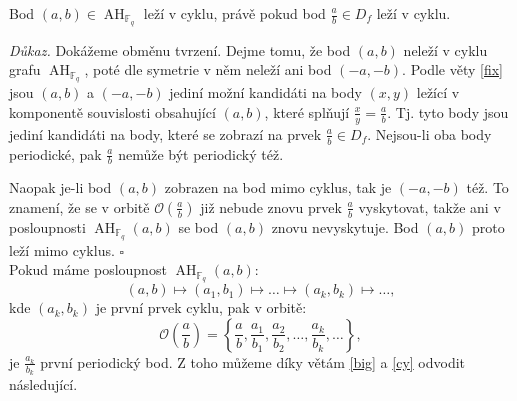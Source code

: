\documentclass[12pt]{report}
\DeclareMathOperator{\AH}{AH}
\begin{document}
\begin{veta}\label{cy}
Bod $(a,b) \in \AH_{\mathbb{F}_q}$ leží v cyklu, právě pokud bod $\frac{a}{b} \in D_f$ leží v cyklu.
\end{veta}
\noindent \textit{Důkaz.} Dokážeme obměnu tvrzení. Dejme tomu, že bod $(a,b)$ neleží v cyklu grafu $\AH_{\mathbb{F}_q}$, poté dle symetrie v něm neleží ani bod $(-a,-b)$. Podle věty \ref{fix} jsou $(a,b)$ a $(-a,-b)$ jediní možní kandidáti na body $(x,y)$ ležící v komponentě souvislosti obsahující $(a,b)$, které splňují $\frac{x}{y} = \frac{a}{b}$. Tj. tyto body jsou jediní kandidáti na body, které se zobrazí na prvek $\frac{a}{b} \in D_f$. Nejsou-li oba body periodické, pak $\frac{a}{b}$ nemůže být periodický též.

Naopak je-li bod $(a,b)$ zobrazen na bod mimo cyklus, tak je $(-a,-b)$ též. To znamení, že se v orbitě $\mathcal{O}\left(\frac{a}{b}\right)$ již nebude znovu prvek $\frac{a}{b}$ vyskytovat, takže ani v posloupnosti $\AH_{\mathbb{F}_q} (a,b)$ se bod $(a,b)$ znovu nevyskytuje. Bod $(a,b)$ proto leží mimo cyklus. \hfill $\square$\\

Pokud máme posloupnost $\AH_{\mathbb{F}_q}(a,b)$:
$$(a,b) \longmapsto (a_1,b_1) \longmapsto \dots \longmapsto (a_k,b_k) \longmapsto \dots,$$
kde $(a_k,b_k)$ je první prvek cyklu, pak v orbitě: $$\mathcal{O}\left(\frac{a}{b}\right) =\left\lbrace \frac{a}{b},\frac{a_1}{b_1},\frac{a_2}{b_2},\dots,\frac{a_k}{b_k},\dots \right\rbrace,$$
je $\frac{a_k}{b_k}$ první periodický bod. Z toho můžeme díky větám \ref{big} a \ref{cy} odvodit následující.
\end{document}
